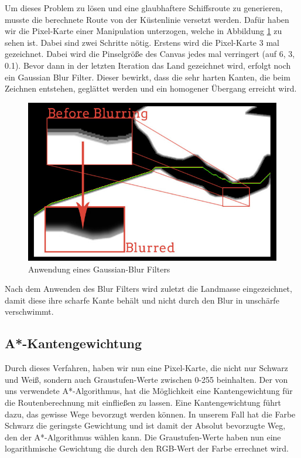 \documentclass[letterpaper]{article}
\begin{document}
		Um dieses Problem zu lösen und eine glaubhaftere Schiffsroute zu generieren, musste die berechnete Route von der Küstenlinie versetzt werden. Dafür haben wir die Pixel-Karte einer Manipulation unterzogen, welche in Abbildung \ref{fig:blur effect} zu sehen ist. Dabei sind zwei Schritte nötig. Erstens wird die Pixel-Karte 3 mal gezeichnet. Dabei wird die Pinselgröße des Canvas jedes mal verringert (auf 6, 3, 0.1). Bevor dann in der letzten Iteration das Land gezeichnet wird, erfolgt noch ein Gaussian Blur Filter\cite{vigour17}. Dieser bewirkt, dass die sehr harten Kanten, die beim Zeichnen entstehen, geglättet werden und ein homogener Übergang erreicht wird.

		\begin{figure}[!htbp]
			\centering
			\includegraphics[width=\linewidth]{blur_effect}
			\caption{Anwendung eines Gaussian-Blur Filters}
			\label{fig:blur effect}
		\end{figure}

		Nach dem Anwenden des Blur Filters wird zuletzt die Landmasse eingezeichnet, damit diese ihre scharfe Kante behält und nicht durch den Blur in unschärfe verschwimmt. 

		\subsection{A*-Kantengewichtung}
			Durch dieses Verfahren, haben wir nun eine Pixel-Karte, die nicht nur Schwarz und Weiß, sondern auch Graustufen-Werte zwischen 0-255 beinhalten. Der von uns verwendete A*-Algorithmus\cite{ginstead14}, hat die Möglichkeit eine Kantengewichtung für die Routenberechnung mit einfließen zu lassen. Eine Kantengewichtung führt dazu, das gewisse Wege bevorzugt werden können. In unserem Fall hat die Farbe Schwarz die geringste Gewichtung und ist damit der Absolut bevorzugte Weg, den der A*-Algorithmus wählen kann. Die Graustufen-Werte haben nun eine logarithmische Gewichtung die durch den RGB-Wert der Farbe errechnet wird.\\
\end{document}
